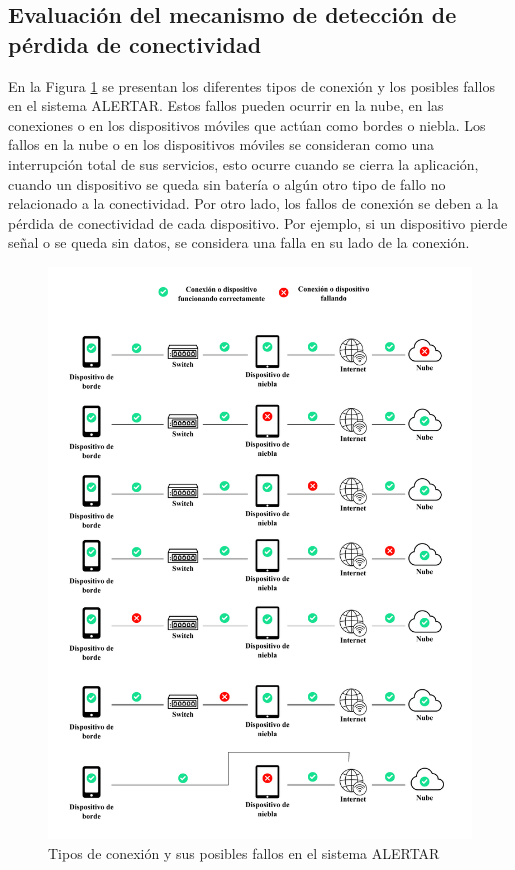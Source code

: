 \subsection{Evaluación del mecanismo de detección de pérdida de conectividad}
    En la Figura \ref{fig:testConexion} se presentan los diferentes tipos de conexión y los posibles fallos en el sistema ALERTAR. Estos fallos pueden ocurrir en la nube, en las conexiones o en los dispositivos móviles que actúan como bordes o niebla. Los fallos en la nube o en los dispositivos móviles se consideran como una interrupción total de sus servicios, esto ocurre cuando se cierra la aplicación, cuando un dispositivo se queda sin batería o algún otro tipo de fallo no relacionado a la conectividad. Por otro lado, los fallos de conexión se deben a la pérdida de conectividad de cada dispositivo. Por ejemplo, si un dispositivo pierde señal o se queda sin datos, se considera una falla en su lado de la conexión.
    
    \begin{figure}
        \centering
        \includegraphics[width=\textwidth, height=\textheight, keepaspectratio]{Imagenes/Test/Conexiones.pdf}
        \caption{Tipos de conexión y sus posibles fallos en el sistema ALERTAR}
        \label{fig:testConexion}
    \end{figure}
    
